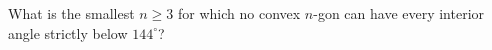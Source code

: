 What is the smallest $n\ge3$ for which no convex $n$-gon can have every interior angle strictly below $144^\circ$?
